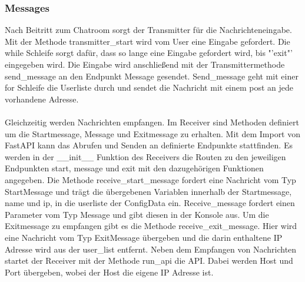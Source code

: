 \subsubsection{Messages}
Nach Beitritt zum Chatroom sorgt der Transmitter für die Nachrichteneingabe. Mit der Methode transmitter\_start wird vom User eine Eingabe gefordert.
Die while Schleife sorgt dafür, dass so lange eine Eingabe gefordert wird, bis "'exit"' eingegeben wird.  
Die Eingabe wird anschließend mit der Transmittermethode send\_message an den Endpunkt Message gesendet. Send\_message geht mit einer for Schleife die Userliste durch und sendet die Nachricht mit einem 
post an jede vorhandene Adresse.
\\
\\
Gleichzeitig werden Nachrichten empfangen. Im Receiver sind Methoden definiert um die Startmessage, Message und Exitmessage zu erhalten.
Mit dem Import von FastAPI kann das Abrufen und Senden an definierte Endpunkte stattfinden. 
Es werden in der \_\_init\_\_ Funktion des Receivers die Routen zu den jeweiligen Endpunkten start, message und exit mit den dazugehörigen Funktionen angegeben.
Die Methode receive\_start\_message fordert eine Nachricht vom Typ StartMessage und trägt die übergebenen Variablen innerhalb der Startmessage, name und ip, in die userliste der ConfigData ein.
Receive\_message fordert einen Parameter vom Typ Message und gibt diesen in der Konsole aus.
Um die Exitmessage zu empfangen gibt es die Methode receive\_exit\_message. Hier wird eine Nachricht vom Typ ExitMessage übergeben und die darin enthaltene IP Adresse wird aus der user\_list entfernt.
Neben dem Empfangen von Nachrichten startet der Receiver mit der Methode run\_api die API. Dabei werden Host und Port übergeben, wobei der Host die eigene IP Adresse ist.


